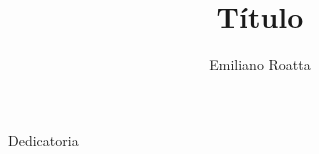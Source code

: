 \documentclass[a4paper,11pt,twoside,openright]{book}
\title{Título}
\author{Emiliano Roatta}
\begin{document}
\frontmatter

\maketitle

\begin{flushright}
\null{}
  Dedicatoria
\null
\end{flushright}



\tableofcontents
\listoffigures
\listoftables
\listofalgorithms

\mainmatter





\backmatter
\end{document}

